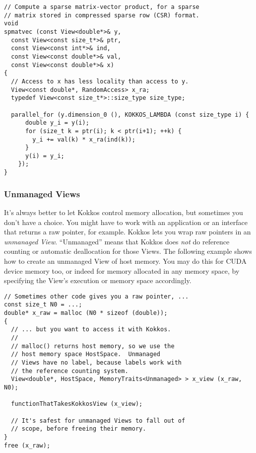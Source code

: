 \begin{lstlisting}
// Compute a sparse matrix-vector product, for a sparse
// matrix stored in compressed sparse row (CSR) format.
void
spmatvec (const View<double*>& y, 
  const View<const size_t*>& ptr,
  const View<const int*>& ind,
  const View<const double*>& val,
  const View<const double*>& x)
{
  // Access to x has less locality than access to y.
  View<const double*, RandomAccess> x_ra;
  typedef View<const size_t*>::size_type size_type;

  parallel_for (y.dimension_0 (), KOKKOS_LAMBDA (const size_type i) {
      double y_i = y(i);
      for (size_t k = ptr(i); k < ptr(i+1); ++k) {
        y_i += val(k) * x_ra(ind(k));
      }
      y(i) = y_i;
    });
}
\end{lstlisting}

\subsubsection{Unmanaged Views}

It's always better to let Kokkos control memory allocation, but
sometimes you don't have a choice.  You might have to work with an
application or an interface that returns a raw pointer, for example.
Kokkos lets you wrap raw pointers in an \emph{unmanaged View}.
``Unmanaged'' means that Kokkos does \emph{not} do reference counting
or automatic deallocation for those Views.  The following example
shows how to create an unmanaged View of host memory.  You may do this
for CUDA device memory too, or indeed for memory allocated in any
memory space, by specifying the View's execution or memory space
accordingly.
\begin{lstlisting}
// Sometimes other code gives you a raw pointer, ...
const size_t N0 = ...;
double* x_raw = malloc (N0 * sizeof (double));
{
  // ... but you want to access it with Kokkos.
  //
  // malloc() returns host memory, so we use the 
  // host memory space HostSpace.  Unmanaged
  // Views have no label, because labels work with
  // the reference counting system.
  View<double*, HostSpace, MemoryTraits<Unmanaged> > x_view (x_raw, N0);

  functionThatTakesKokkosView (x_view);

  // It's safest for unmanaged Views to fall out of
  // scope, before freeing their memory.
}
free (x_raw);
\end{lstlisting}

